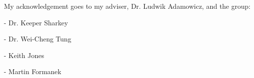 My acknowledgement goes to my adviser, Dr. Ludwik Adamowicz, and the group:

- Dr. Keeper Sharkey

- Dr. Wei-Cheng Tung

- Keith Jones

- Martin Formanek
